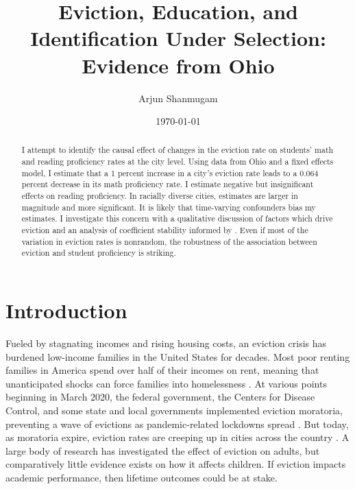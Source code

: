 \documentclass[12pt]{article}
\begin{document}
\begin{titlepage}
\title{Eviction, Education, and Identification Under Selection: Evidence from Ohio}
\author{Arjun Shanmugam}
\date{\today}
\maketitle
\begin{abstract}
\noindent I attempt to identify the causal effect of changes in the eviction rate on students' math and reading proficiency rates at the city level. Using data from Ohio and a fixed effects model, I estimate that a 1 percent increase in a city's eviction rate leads to a 0.064 percent decrease in its math proficiency rate. I estimate negative but insignificant effects on reading proficiency. In racially diverse cities, estimates are larger in magnitude and more significant. It is likely that time-varying confounders bias my estimates. I investigate this concern with a qualitative discussion of factors which drive eviction and an analysis of coefficient stability informed by \cite{oster_unobservable_2019}. Even if most of the variation in eviction rates is nonrandom, the robustness of the association between eviction and student proficiency is striking. \\

\bigskip
\end{abstract}
\setcounter{page}{0}
\thispagestyle{empty}
\end{titlepage}
\pagebreak \newpage




\doublespacing


\section{Introduction} \label{sec:introduction}
Fueled by stagnating incomes and rising housing costs, an eviction crisis has burdened low-income families in the United States for decades. Most poor renting families in America spend over half of their incomes on rent, meaning that unanticipated shocks can force families into homelessness \citep{desmond_evicted:_2017}. At various points beginning in March 2020, the federal government, the Centers for Disease Control, and some state and local governments implemented eviction moratoria, preventing a wave of evictions as pandemic-related lockdowns spread \citep{thrush_federal_2021, goldstein_landlords_2020}. But today, as moratoria expire, eviction rates are creeping up in cities across the country \citep{zaveri_after_2022}. A large body of research has investigated the effect of eviction on adults, but comparatively little evidence exists on how it affects children. If eviction impacts academic performance, then lifetime outcomes could be at stake.
\end{document}
